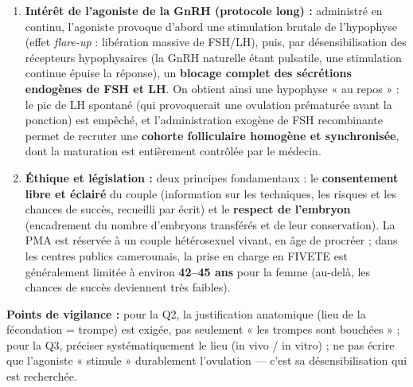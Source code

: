 \documentclass[11pt]{article}
\begin{document}
\begin{corrige}
\begin{enumerate}
\begin{enumerate}
    \end{enumerate}
    \item \textbf{Intérêt de l'agoniste de la GnRH (protocole long) :} administré en continu, l'agoniste provoque d'abord une stimulation brutale de l'hypophyse (effet \emph{flare-up} : libération massive de FSH/LH), puis, par désensibilisation des récepteurs hypophysaires (la GnRH naturelle étant pulsatile, une stimulation continue épuise la réponse), un \textbf{blocage complet des sécrétions endogènes de FSH et LH}. On obtient ainsi une hypophyse « au repos » : le pic de LH spontané (qui provoquerait une ovulation prématurée avant la ponction) est empêché, et l'administration exogène de FSH recombinante permet de recruter une \textbf{cohorte folliculaire homogène et synchronisée}, dont la maturation est entièrement contrôlée par le médecin.
    \item \textbf{Éthique et législation :} deux principes fondamentaux : le \textbf{consentement libre et éclairé} du couple (information sur les techniques, les risques et les chances de succès, recueilli par écrit) et le \textbf{respect de l'embryon} (encadrement du nombre d'embryons transférés et de leur conservation). La PMA est réservée à un couple hétérosexuel vivant, en âge de procréer ; dans les centres publics camerounais, la prise en charge en FIVETE est généralement limitée à environ \textbf{42--45 ans} pour la femme (au-delà, les chances de succès deviennent très faibles).
\end{enumerate}
\textbf{Points de vigilance :} pour la Q2, la justification anatomique (lieu de la fécondation = trompe) est exigée, pas seulement « les trompes sont bouchées » ; pour la Q3, préciser systématiquement le lieu (in vivo / in vitro) ; ne pas écrire que l'agoniste « stimule » durablement l'ovulation — c'est sa désensibilisation qui est recherchée.
\end{corrige}
\end{document}

